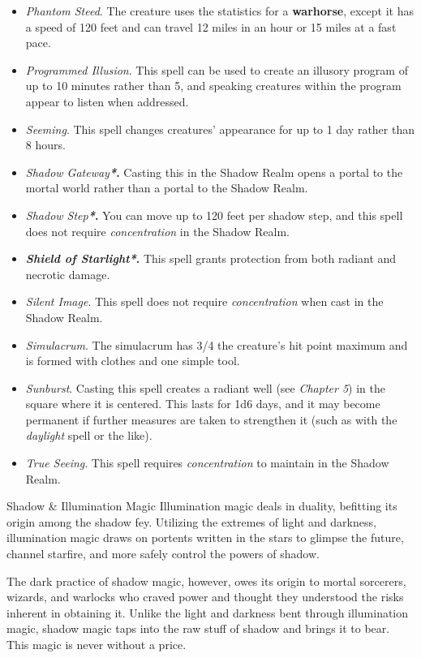 \documentclass[10pt,a4paper,twoside,bg=print,twocolumn,openany,nodeprecatedcode]{dndbook}
\begin{document}
\begin{itemize}
\item \textit{Phantom Steed}. The creature uses the statistics for a \textbf{warhorse}, except it has a speed of 120 feet and can travel 12 miles in an hour or 15 miles at a fast pace.
\item \textit{Programmed Illusion}. This spell can be used to create an illusory program of up to 10 minutes rather than 5, and speaking creatures within the program appear to listen when addressed.
\item \textit{Seeming}. This spell changes creatures' appearance for up to 1 day rather than 8 hours.
\item \textit{Shadow Gateway}\textbf{\textit{*}.} Casting this in the Shadow Realm opens a portal to the mortal world rather than a portal to the Shadow Realm.
\item \textit{Shadow Step}\textbf{\textit{*}.} You can move up to 120 feet per shadow step, and this spell does not require \textit{concentration} in the Shadow Realm.
\item \textbf{\textit{Shield of Starlight*}.} This spell grants protection from both radiant and necrotic damage.
\item \textit{Silent Image}. This spell does not require \textit{concentration} when cast in the Shadow Realm.
\item \textit{Simulacrum}. The simulacrum has 3/4 the creature's hit point maximum and is formed with clothes and one simple tool.
\item \textit{Sunburst}. Casting this spell creates a radiant well (see \textit{Chapter 5}) in the square where it is centered. This lasts for 1d6 days, and it may become permanent if further measures are taken to strengthen it (such as with the \textit{daylight} spell or the like).
\item \textit{True Seeing}. This spell requires \textit{concentration} to maintain in the Shadow Realm.
\end{itemize}

\begin{DndSidebar}[float=!b]{Shadow \& Illumination Magic}
Illumination magic deals in duality, befitting its origin among the shadow fey. Utilizing the extremes of light and darkness, illumination magic draws on portents written in the stars to glimpse the future, channel starfire, and more safely control the powers of shadow.



The dark practice of shadow magic, however, owes its origin to mortal sorcerers, wizards, and warlocks who craved power and thought they understood the risks inherent in obtaining it. Unlike the light and darkness bent through illumination magic, shadow magic taps into the raw stuff of shadow and brings it to bear. This magic is never without a price.



\end{DndSidebar}
\end{document}
